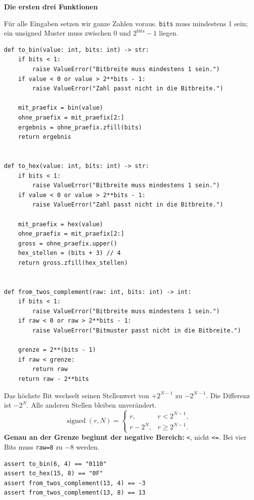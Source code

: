 \documentclass[10pt,a4paper]{article}
\newcommand{\titlepagepart}[2]{\vspace*{-4mm}{\sffamily\small #1}\par{\sffamily\LARGE\bfseries #2}\par\vspace{2mm}}
\newcommand{\block}[1]{\par\vspace{2mm}{\sffamily\large\bfseries #1}\par}
\newcommand{\code}[1]{\texttt{#1}}
\begin{document}
\newpage
\titlepagepart{05 / REFERENZCODE}{Die ersten drei Funktionen}
Für alle Eingaben setzen wir ganze Zahlen voraus. \code{bits} muss mindestens 1
sein; ein unsigned Muster muss zwischen $0$ und $2^{\mathrm{bits}}-1$ liegen.
\begin{lstlisting}
def to_bin(value: int, bits: int) -> str:
    if bits < 1:
        raise ValueError("Bitbreite muss mindestens 1 sein.")
    if value < 0 or value > 2**bits - 1:
        raise ValueError("Zahl passt nicht in die Bitbreite.")

    mit_praefix = bin(value)
    ohne_praefix = mit_praefix[2:]
    ergebnis = ohne_praefix.zfill(bits)
    return ergebnis


def to_hex(value: int, bits: int) -> str:
    if bits < 1:
        raise ValueError("Bitbreite muss mindestens 1 sein.")
    if value < 0 or value > 2**bits - 1:
        raise ValueError("Zahl passt nicht in die Bitbreite.")

    mit_praefix = hex(value)
    ohne_praefix = mit_praefix[2:]
    gross = ohne_praefix.upper()
    hex_stellen = (bits + 3) // 4
    return gross.zfill(hex_stellen)


def from_twos_complement(raw: int, bits: int) -> int:
    if bits < 1:
        raise ValueError("Bitbreite muss mindestens 1 sein.")
    if raw < 0 or raw > 2**bits - 1:
        raise ValueError("Bitmuster passt nicht in die Bitbreite.")

    grenze = 2**(bits - 1)
    if raw < grenze:
        return raw
    return raw - 2**bits
\end{lstlisting}
\block{Warum wird beim Dekodieren $2^N$ abgezogen?}
Das höchste Bit wechselt seinen Stellenwert von $+2^{N-1}$ zu $-2^{N-1}$.
Die Differenz ist $-2^N$. Alle anderen Stellen bleiben unverändert.
\[
\operatorname{signed}(r,N)=
\begin{cases}
r,&r<2^{N-1},\\
r-2^N,&r\geq2^{N-1}.
\end{cases}
\]
\textbf{Genau an der Grenze beginnt der negative Bereich:} \code{<}, nicht
\code{<=}. Bei vier Bits muss \code{raw=8} zu $-8$ werden.
\begin{lstlisting}
assert to_bin(6, 4) == "0110"
assert to_hex(15, 8) == "0F"
assert from_twos_complement(13, 4) == -3
assert from_twos_complement(13, 8) == 13
\end{lstlisting}
\end{document}
